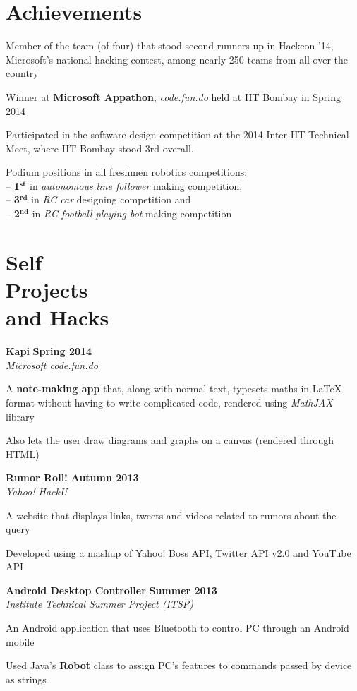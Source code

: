\documentclass[margin,11pt]{resume}
\begin{document}
\begin{resume}
\section{\mysidestyle Achievements}
\begin{list2}
\item Member of the team (of four) that stood second runners up in Hackcon '14, Microsoft's national hacking contest, among nearly 250 teams from all over the country
\item Winner at \textbf{Microsoft Appathon}, \textsl{code.fun.do} held at IIT Bombay in Spring 2014
\item Participated in the software design competition at the 2014 Inter-IIT Technical Meet, where IIT Bombay stood 3rd overall.
\item Podium positions in all freshmen robotics competitions: \\
-- \textbf{1$^{\textbf{st}}$} in \textsl{autonomous line follower} making competition,\\ -- \textbf{3$^{\textbf{rd}}$} in \textsl{RC car} designing competition and\\ 
-- \textbf{2$^{\textbf{nd}}$} in \textsl{RC football-playing bot} making competition
\end{list2}

\section{\mysidestyle Self \\ Projects \\ and Hacks}
\textbf{Kapi} \hfill \textbf{Spring 2014}\\
\textsl{Microsoft code.fun.do}
\begin{list2}
\item A \textbf{note-making app} that, along with normal text, typesets maths in \LaTeX{} format without having to write complicated code, rendered using \textsl{MathJAX} library
\item Also lets the user draw diagrams and graphs on a canvas (rendered through HTML)
\end{list2}
\vspace{-2.5mm}
\textbf{Rumor Roll!} \hfill \textbf{Autumn 2013}\\
\textsl{Yahoo! HackU}
\begin{list2}
\item A website that displays links, tweets and videos related to rumors about the query
\item Developed using a mashup of Yahoo! Boss API, Twitter API v2.0 and YouTube API
\end{list2}
\vspace{-2.5mm}
\textbf{Android Desktop Controller} \hfill \textbf{Summer 2013}\\
\textsl{Institute Technical Summer Project (ITSP)}
\begin{list2}
\item An Android application that uses Bluetooth to control PC through an Android mobile 
\item Used Java's \textbf{Robot} class to assign PC's features to commands passed by device as strings
\end{list2}


\end{resume}
\end{document}
